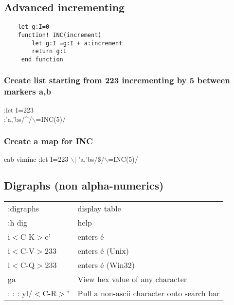 \subsection{Advanced incrementing}

\begin{code}

\begin{verbatim}
    let g:I=0
    function! INC(increment)
        let g:I =g:I + a:increment
        return g:I
     end function
\end{verbatim}
\end{code}

\subsubsection{Create list starting from 223 incrementing by 5 between markers a,b}
:let I=223\\
:'a,'bs/\^{}/$\backslash$=INC(5)/

\subsubsection{Create a map for INC}
cab viminc :let I=223 $\backslash$$|$ 'a,'bs/\$/$\backslash$=INC(5)/

\subsection{Digraphs (non alpha-numerics)}
\begin{center}
\begin{longtable}{l|l}
:digraphs                         & display table\\
:h dig                            & help\\
i$<$C-K$>$e'                      & enters é\\
i$<$C-V$>$233                     & enters é (Unix)\\
i$<$C-Q$>$233                     & enters é (Win32)\\
ga                                & View hex value of any character\\
:%
:%
:%
yl/$<$C-R$>$" &  Pull a non-ascii character onto search bar
\end{longtable}
\end{center}

